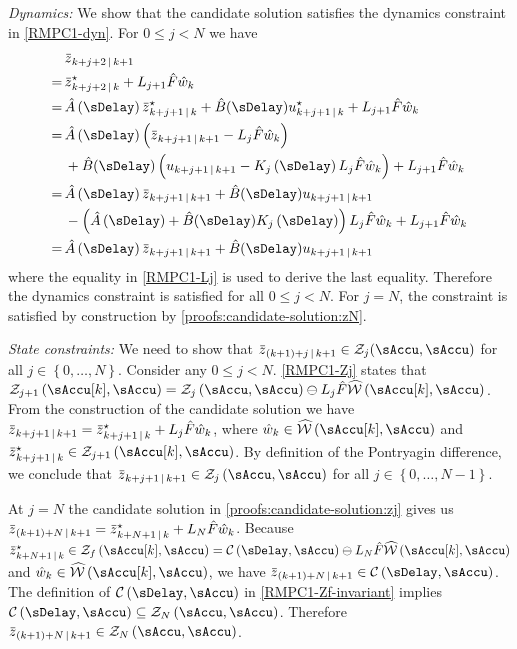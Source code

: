 \noindent\textit{Dynamics:}
%
We show that the candidate solution satisfies the dynamics constraint
in \eqref{RMPC1-dyn}. For $0\leq j<N$ we have
\begin{align*}
&\Nom z_{k+j+2\Given k+1} \\
=\, & \Nom z_{k+j+2\Given k}^{\star}+L_{j+1}\hat{F}\hat{w}_{k}\\
=\, &\hat{A}\left(\sDelay\right)\Nom z_{k+j+1\Given k}^{\star}+\hat{B}(\sDelay)u_{k+j+1\Given k}^{\star}+L_{j+1}\hat{F}\hat{w}_{k}\\
=\, &\hat{A}\left(\sDelay\right)\left(\Nom z_{k+j+1\Given k+1}-L_{j}\hat{F}\hat{w}_{k}\right) \\
&+\hat{B}(\sDelay)\left(u_{k+j+1\Given k+1}-K_{j}\left(\sDelay\right)L_{j}\hat{F}\hat{w}_{k}\right) +L_{j+1}\hat{F}\hat{w}_{k} \\
=\, &\hat{A}\left(\sDelay\right)\Nom z_{k+j+1\Given k+1}+\hat{B}(\sDelay)u_{k+j+1\Given k+1} \\
&-\left(\hat{A}\left(\sDelay\right) + \hat{B}(\sDelay)K_{j}\left(\sDelay\right)\right)L_{j}\hat{F}\hat{w}_{k}+L_{j+1}\hat{F}\hat{w}_{k}\\
=\, &\hat{A}\left(\sDelay\right)\Nom z_{k+j+1\Given k+1}+\hat{B}(\sDelay)u_{k+j+1\Given k+1}
\end{align*}
where the equality in \eqref{RMPC1-Lj} is used to derive the last
equality. %
Therefore the dynamics constraint
is satisfied for all $0\leq j<N$. For $j=N$, the constraint is satisfied
by construction by \eqref{proofs:candidate-solution:zN}.


\noindent\textit{State constraints:}
%
We need to show that $\Nom z_{(k+1)+j\Given k+1}\in\ZSet_{j}\text{\ensuremath{\left(\sAccu,\sAccu\right)}}$
for all $j\in\left\{ 0,\dots,N\right\} $. Consider any $0\leq j<N$.
\eqref{RMPC1-Zj} states that $\ZSet_{j+1}\left(\sAccu[k],\sAccu\right)=\ZSet_{j}\left(\sAccu,\sAccu\right)\ominus L_{j}\hat{F}\WhSet\left(\sAccu[k],\sAccu\right)$.
From the construction of the candidate solution we have $\Nom z_{k+j+1\Given k+1}=\Nom z_{k+j+1\Given k}^{\star}+L_{j}\hat{F}\hat{w}_{k}$,
where $\hat{w}_{k}\in\WhSet\left(\sAccu[k],\sAccu\right)$ and $\Nom z_{k+j+1\Given k}^{\star}\in\ZSet_{j+1}\left(\sAccu[k],\sAccu\right)$.
By definition of the Pontryagin difference, we conclude that $\Nom z_{k+j+1\Given k+1}\in\ZSet_{j}\left(\sAccu,\sAccu\right)$
for all $j\in\left\{ 0,\dots,N-1\right\} $.

At $j=N$ the candidate solution in \eqref{proofs:candidate-solution:zj}
gives us $\Nom z_{(k+1)+N\Given k+1}=\Nom z_{k+N+1\Given k}^{\star}+L_{N}\hat{F}\hat{w}_{k}$.
Because $\Nom z_{k+N+1\Given k}^{\star}\in\ZSet_{f}\left(\sAccu[k],\sAccu\right)=\CCC\left(\sDelay,\sAccu\right)\ominus L_{N}\hat{F}\WhSet\left(\sAccu[k],\sAccu\right)$
and $\hat{w}_{k}\in\WhSet\left(\sAccu[k],\sAccu\right)$, we have
$\Nom z_{(k+1)+N\Given k+1}\in\CCC\left(\sDelay,\sAccu\right)$. The
definition of $\CCC\left(\sDelay,\sAccu\right)$ in \eqref{RMPC1-Zf-invariant}
implies $\CCC\left(\sDelay,\sAccu\right)\subseteq\ZSet_{N}\left(\sAccu,\sAccu\right)$.
Therefore $\Nom z_{(k+1)+N\Given k+1}\in\ZSet_{N}\left(\sAccu,\sAccu\right)$.


